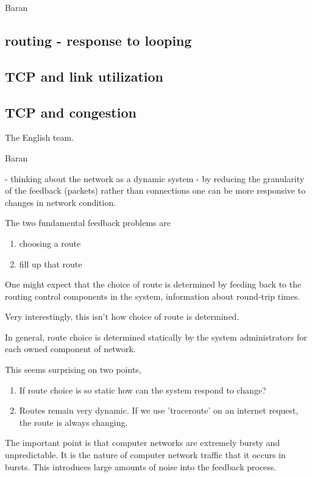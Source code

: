Baran

\subsection{routing - response to looping}

\subsection{TCP and link utilization}

\subsection{TCP and congestion}


The English team.

Baran

- thinking about the network as a dynamic system
- by reducing the granularity of the feedback (packets) rather than connections one can be more
  responsive to changes in network condition.


The two fundamental feedback problems are

\begin{enumerate}
    \item choosing a route
    \item fill up that route
\end{enumerate}


One might expect that the choice of route is determined by feeding back to the routing control
components in the system, information about round-trip times.

Very interestingly, this isn't how choice of route is determined.

In general, route choice is determined statically by the system administrators for each owned
component of network.  

This seems surprising on two points,

\begin{enumerate}
    \item If route choice is so static how can the system respond to change?
    \item Routes remain very dynamic. If we use 'traceroute' on an internet request, the route is
        always changing.
\end{enumerate}

The important point is that computer networks are extremely bursty and unpredictable. It is the
nature of computer network traffic that it occurs in bursts. This introduces large amounts of noise
into the feedback process. 

